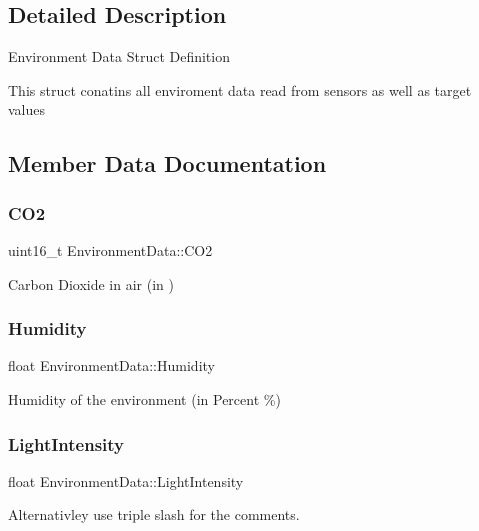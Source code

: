 \subsection{Detailed Description}
Environment Data Struct Definition

This struct conatins all enviroment data read from sensors as well as target values 

\subsection{Member Data Documentation}
\mbox{\label{structEnvironmentData_a5fe69eb57f3debefe5feba3a930ab851}} 
\subsubsection{\texorpdfstring{C\+O2}{CO2}}
{\footnotesize\ttfamily uint16\+\_\+t Environment\+Data\+::\+C\+O2}

Carbon Dioxide in air (in ) \mbox{\label{structEnvironmentData_a84e684c2dc15c5fb6bd87a03569cab05}} 
\subsubsection{\texorpdfstring{Humidity}{Humidity}}
{\footnotesize\ttfamily float Environment\+Data\+::\+Humidity}

Humidity of the environment (in Percent \%) \mbox{\label{structEnvironmentData_a2013551c12a584a6680517d750b2116a}} 
\subsubsection{\texorpdfstring{Light\+Intensity}{LightIntensity}}
{\footnotesize\ttfamily float Environment\+Data\+::\+Light\+Intensity}



Alternativley use triple slash for the comments. 

